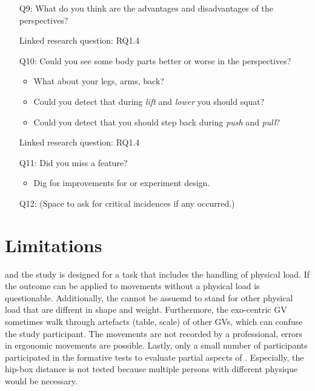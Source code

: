 \begin{itemize}
	\item[Q9:] What do you think are the advantages and disadvantages of the perspectives?
	\item[] Linked research question: RQ1.4
	
	\item[Q10:] Could you see some body parts better or worse in the perspectives?
	\begin{itemize}
		\item What about your legs, arms, back?
		\item Could you detect that during \textit{lift} and \textit{lower} you should squat?
		\item Could you detect that you should step back during \textit{push} and \textit{pull}?
	\end{itemize}
	\item[] Linked research question: RQ1.4
	
	\item[Q11:] Did you miss a feature?
	\begin{itemize}
		\item Dig for improvements for \exgo or experiment design.
	\end{itemize}
	
	\item[Q12:] (Space to ask for critical incidences if any occurred.)
\end{itemize}

\section{Limitations}
\label{sec:limitations}
\exgo and the study is designed for a task that includes the handling of physical load. If the outcome can be applied to movements without a physical load is questionable. Additionally, the cannot be assuemd to stand for other physical load that are diffrent in shape and weight. Furthermore, the exo-centric GV sometimes walk through artefacts (table, scale) of other GVs, which can confuse the study participant. The movements are not recorded by a professional, errors in ergonomic movements are possible. Lastly, only a small number of participants participated in the formative tests to evaluate partial aspects of \exgo. Especially, the hip-box distance is not tested because multiple persons with different physique would be necessary.\\

